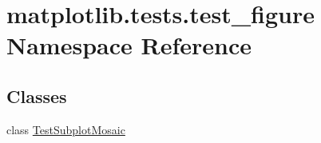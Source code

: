 \hypertarget{namespacematplotlib_1_1tests_1_1test__figure}{}\section{matplotlib.\+tests.\+test\+\_\+figure Namespace Reference}
\label{namespacematplotlib_1_1tests_1_1test__figure}
\subsection*{Classes}
\begin{DoxyCompactItemize}
\item 
class \hyperlink{classmatplotlib_1_1tests_1_1test__figure_1_1TestSubplotMosaic}{Test\+Subplot\+Mosaic}
\end{DoxyCompactItemize}

